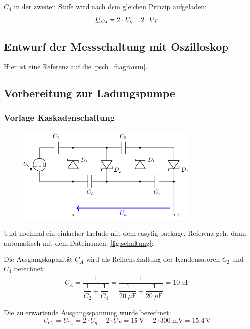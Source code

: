 \documentclass[
12pt,
a4paper,
bibliography=totoc,
listof=totoc,
headings=small,
parskip=half*, %
]{scrartcl}
\newcommand{\ul}[1]{\underline{#1\mkern-1.5mu}\mkern 1.5mu}
\newcommand{\laborsubsection}[2] {
	\renewcommand{\thesubsection}{#1 \thesection.\arabic{subsection}}
	\subsection{#2}
	\renewcommand{\thesubsection}{\thesection.\arabic{subsection}}
}
\begin{document}
$C_4$ in der zweiten Stufe wird nach dem gleichen Prinzip aufgeladen:
\begin{equation}
	\ul{U}_{C_4} = 2 \cdot U_{q} - 2 \cdot U_{F}
\end{equation}

\laborsubsection{V}{Entwurf der Messschaltung mit Oszilloskop}
Hier ist eine Referenz auf die \autoref{psch_diagramm}.
\begin{figure}[H]
	\centering
	\label{psch_diagramm}
\end{figure}

\laborsubsection{V}{Vorbereitung zur Ladungspumpe}
\subsubsection{Vorlage Kaskadenschaltung}
\begin{figure}[H]
	\centering
	\includegraphics[width=0.8\textwidth]{schaltung}
	\label{kaskadenschaltung}
\end{figure}

Und nochmal ein einfacher Include mit dem easyfig package. Referenz geht dann automatisch mit dem Dateinamen: \autoref{fig:schaltung}:

Die Ausgangskapazität $C_A$ wird als Reihenschaltung der Kondensatoren $C_2$ und $C_4$ berechnet:
\begin{align}
	C_A = \dfrac{1}{\dfrac{1}{C_2}+\dfrac{1}{C_4}} = \dfrac{1}{\dfrac{1}{\SI{20}{\mu\farad}}+\dfrac{1}{\SI{20}{\mu\farad}}} = \SI{10}{\mu\farad}
\end{align}

Die zu erwartende Ausgangsspannung wurde berechnet:
\begin{equation}
	U_{C_2} =  U_{C_4}  = 2 \cdot U_{q} - 2 \cdot U_{F} = \SI{16}{\volt} - 2 \cdot \SI{300}{\milli\volt} = \SI{15,4}{\volt}
\end{equation}
\end{document}
